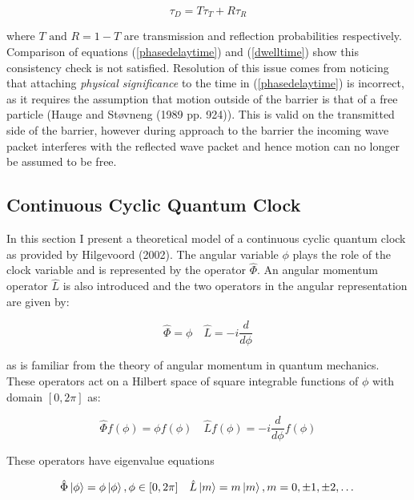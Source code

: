 \documentclass{article}
\begin{document}
\begin{equation}
	\tau_D = T\tau_T+R\tau_R
	\label{dwellcondition}
\end{equation}

\noindent where $T \text{ and } R = 1-T$ are transmission and reflection probabilities respectively. Comparison of equations (\ref{phasedelaytime}) and (\ref{dwelltime}) show this consistency check is not satisfied. Resolution of this issue comes from noticing that attaching \textit{physical significance} to the time in (\ref{phasedelaytime}) is incorrect, as it requires the assumption that motion outside of the barrier is that of a free particle (Hauge and St{\o}vneng (1989 pp. 924)). This is valid on the transmitted side of the barrier, however during approach to the barrier the incoming wave packet interferes with the reflected wave packet and hence motion can no longer be assumed to be free.
\subsection{Continuous Cyclic Quantum Clock}
\label{subsection:ccqc}

In this section I present a theoretical model of a continuous cyclic quantum clock as provided by Hilgevoord (2002). The angular variable $\phi$ plays the role of the clock variable and is represented by the operator $\hat{\Phi}$. An angular momentum operator $\hat{L}$ is also introduced and the two operators in the angular representation are given by:

\begin{equation}
	\hat{\Phi} = \phi \quad \hat{L} = -i \frac{d}{d\phi}
\end{equation}

\noindent as is familiar from the theory of angular momentum in quantum mechanics. These operators act on a Hilbert space of square integrable functions of $\phi$ with domain $[0,2\pi]$ as:

\begin{equation}
	\hat{\Phi} f(\phi) = \phi f(\phi) \quad \hat{L} f(\phi) = -i \frac{d}{d\phi}f(\phi)
\end{equation}

\noindent These operators have eigenvalue equations 

\begin{equation}
	\hat{\Phi}\ket{\phi} = \phi\ket{\phi}, \phi \in [0,2\pi] \quad \hat{L}\ket{m} = m\ket{m}, m = 0, \pm 1, \pm 2,\dots
\end{equation}
\end{document}
